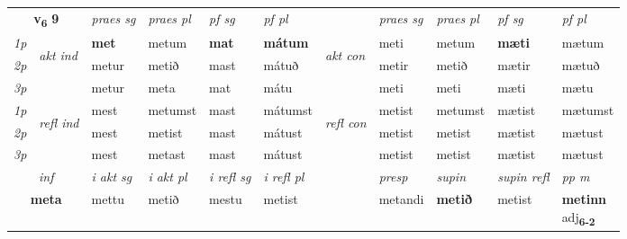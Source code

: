 \noindent
\begin{tabular}{lllllllllll} \toprule
\multicolumn{2}{c}{\textbf{v{\textsubscript{6}}} \Large{\textbf{9}}}  &  \textit{praes sg}  & \textit{praes pl}  &\textit{ pf sg} & \textit{pf pl} &  &  \textit{praes sg}  & \textit{praes pl}  & \textit{pf sg} & \textit{pf pl } \\*
	\cmidrule{3-6} \cmidrule{8-11}
 {\textit{1p}} & \multirow{3}{*}{\begin{turn}{90}\textit{akt ind}\end{turn}} & \textbf{met} & metum & \textbf{mat} & \textbf{mátum} & \multirow{3}{*}{\begin{turn}{90}\textit{akt con}\end{turn}} &meti & metum & \textbf{mæti} & mætum\\*
 {\textit{2p}} &  &  metur  & metið & mast & mátuð & & metir & metið & mætir & mætuð \\*
{\textit{3p}} &  & metur & meta & mat & mátu & & meti & meti& mæti & mætu \\*
\cmidrule{3-6} \cmidrule{8-11}
 {\textit{1p}} & \multirow{3}{*}{\begin{turn}{90}\textit{refl ind}\end{turn}}  & mest & metumst & mast & mátumst & \multirow{3}{*}{\begin{turn}{90}\textit{refl con}\end{turn}}  &metist & metumst & mætist & mætumst \\*
 {\textit{2p}} &  & mest & metist & mast & mátust & &metist & metist & mætist & mætust \\*
 {\textit{3p}}  & & mest & metast & mast & mátust & & metist & metist& mætist & mætust \\*
\cmidrule{3-6} \cmidrule{8-11}

   \multicolumn{2}{c}{\textit{inf}}  & \textit{i akt sg} & \textit{i akt pl} & \textit{i refl sg} & \textit{i refl pl} && \textit{presp} & \textit{supin} & \textit{supin refl} & \textit{pp m} \\*
  \multicolumn{2}{c}{\textbf{meta}} & mettu  & metið & mestu & metist && metandi &  \textbf{metið} & metist & \specialcell{\textbf{metinn} \\ adj\textbf{\textsubscript{6-2}}} \\*
\end{tabular}

